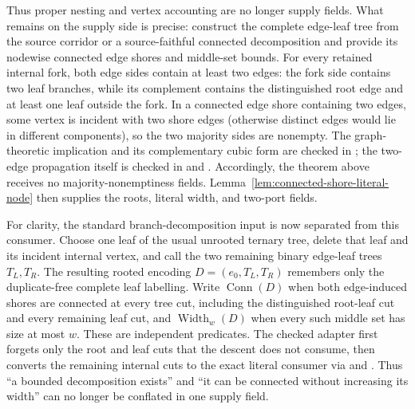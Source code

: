 Thus proper nesting and vertex accounting are no longer supply fields.  What
remains on the supply side is precise: construct the complete edge-leaf tree
from the source corridor or a source-faithful connected decomposition and
provide its nodewise connected edge shores and middle-set bounds.  For every
retained internal fork, both edge sides contain at least two edges: the fork
side contains two leaf branches, while its complement contains the
distinguished root edge and at least one leaf outside the fork.  In a
connected edge shore containing two edges, some vertex is incident with two
shore edges (otherwise distinct edges would lie in different components), so
the two majority sides are nonempty.  The graph-theoretic implication and its
complementary cubic form are checked in
;
the two-edge propagation itself is checked in
and
.
Accordingly, the theorem above receives no majority-nonemptiness fields.
Lemma~\ref{lem:connected-shore-literal-node} then supplies the roots, literal
width, and two-port fields.

For clarity, the standard branch-decomposition input is now separated from
this consumer.  Choose one leaf of the usual unrooted ternary tree, delete
that leaf and its incident internal vertex, and call the two remaining
binary edge-leaf trees $T_L,T_R$.  The resulting rooted encoding
$D=(e_0,T_L,T_R)$ remembers only the duplicate-free complete leaf labelling.
Write $\operatorname{Conn}(D)$ when both edge-induced shores are connected at
every tree cut, including the distinguished root-leaf cut and every remaining
leaf cut, and $\operatorname{Width}_w(D)$ when every such middle set has size
at most $w$.  These are independent predicates.  The checked adapter first
forgets only the root and leaf cuts that the descent does not consume, then
converts the remaining internal cuts to the exact literal consumer via
and
.
Thus ``a bounded decomposition exists'' and ``it can be connected without
increasing its width'' can no longer be conflated in one supply field.

